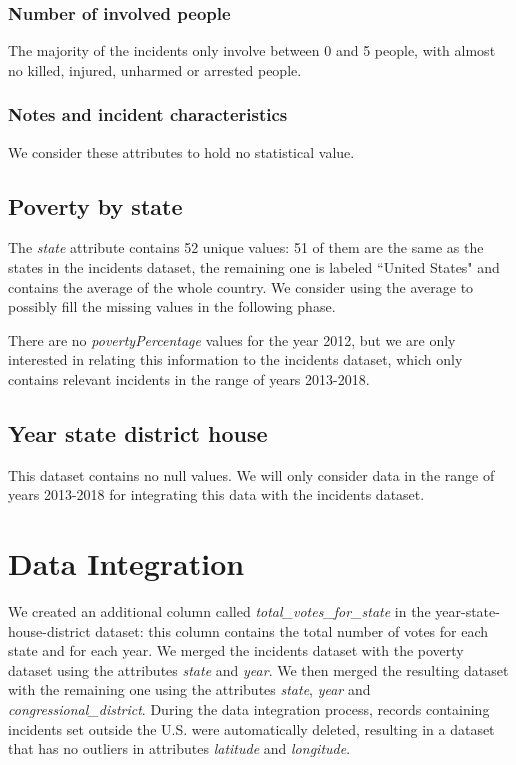 \documentclass[11pt,a4paper]{report}
\begin{document}
\subsubsection{Number of involved people}

The majority of the incidents only involve between 0 and 5 people, with almost no killed, injured, unharmed or arrested people.

\subsubsection{Notes and incident characteristics}

We consider these attributes to hold no statistical value.

\subsection{Poverty by state}

The \textit{state} attribute contains 52 unique values: 51 of them are the same as the states in the incidents dataset, the remaining one is labeled ``United States" and contains the average of the whole country.
We consider using the average to possibly fill the missing values in the following phase.

There are no \textit{povertyPercentage} values for the year 2012, but we are only interested in relating this information to the incidents dataset, which only contains relevant incidents in the range of years 2013-2018.

\subsection{Year state district house}

This dataset contains no null values.
We will only consider data in the range of years 2013-2018 for integrating this data with the incidents dataset.

\section{Data Integration}

We created an additional column called \textit{total\_votes\_for\_state} in the year-state-house-district dataset: this column contains the total number of votes for each state and for each year.
We merged the incidents dataset with the poverty dataset using the attributes \textit{state} and \textit{year}.
We then merged the resulting dataset with the remaining one using the attributes \textit{state}, \textit{year} and \textit{congressional\_district}.
During the data integration process, records containing incidents set outside the U.S. were automatically deleted, resulting in a dataset that has no outliers in attributes \textit{latitude} and \textit{longitude}.
\end{document}
